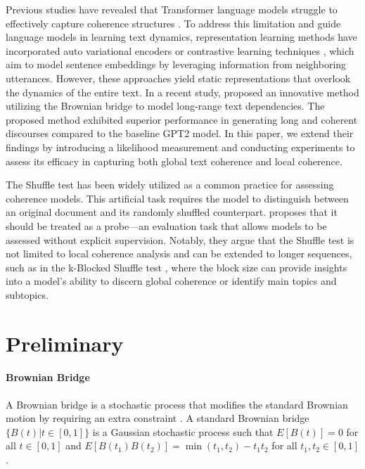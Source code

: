 \documentclass[letterpaper]{article} %
\begin{document}
Previous studies have revealed that Transformer language models struggle to effectively capture coherence structures \citep{deng2022model}. To address this limitation and guide language models in learning text dynamics, representation learning methods have incorporated auto variational encoders \citep{bowman2016generating} or contrastive learning techniques \citep{gao2022simcse}, which aim to model sentence embeddings by leveraging information from neighboring utterances. However, these approaches yield static representations that overlook the dynamics of the entire text. In a recent study, \citet{wang2023language} proposed an innovative method utilizing the Brownian bridge to model long-range text dependencies. The proposed method exhibited superior performance in generating long and coherent discourses compared to the baseline GPT2 model. In this paper, we extend their findings by introducing a likelihood measurement and conducting experiments to assess its efficacy in capturing both global text coherence and local coherence.

The Shuffle test \citep{barzilay-lapata-2008-modeling} has been widely utilized as a common practice for assessing coherence models. This artificial task requires the model to distinguish between an original document and its randomly shuffled counterpart. \citet{laban-etal-2021-transformer} proposes that it should be treated as a probe—an evaluation task that allows models to be assessed without explicit supervision. Notably, they argue that the Shuffle test is not limited to local coherence analysis and can be extended to longer sequences, such as in the k-Blocked Shuffle test \citep{van1985semantic,hearst-1997-text}, where the block size can provide insights into a model's ability to discern global coherence or identify main topics and subtopics.


\section{Preliminary} \label{methods}
\paragraph{Brownian Bridge}
A Brownian bridge is a stochastic process that modifies the standard Brownian motion by requiring an extra constraint \citep{chow2009brownian,revuz2013continuous}. A standard Brownian bridge $\{B(t)|t\in [0,1]\}$ is a Gaussian stochastic process such that $E[B(t)] = 0$ for all $t\in[0,1]$ and $E[B(t_1)B(t_2)]=\min(t_1,t_2)-t_1t_2$ for all $t_1,t_2\in [0,1]$. 
\end{document}
